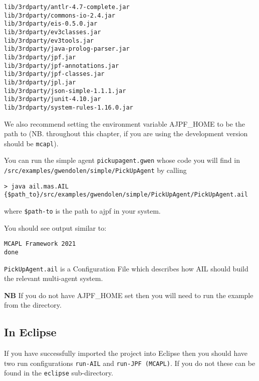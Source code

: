 \begin{verbatim}
lib/3rdparty/antlr-4.7-complete.jar
lib/3rdparty/commons-io-2.4.jar
lib/3rdparty/eis-0.5.0.jar
lib/3rdparty/ev3classes.jar
lib/3rdparty/ev3tools.jar
lib/3rdparty/java-prolog-parser.jar
lib/3rdparty/jpf.jar
lib/3rdparty/jpf-annotations.jar
lib/3rdparty/jpf-classes.jar
lib/3rdparty/jpl.jar
lib/3rdparty/json-simple-1.1.1.jar
lib/3rdparty/junit-4.10.jar
lib/3rdparty/system-rules-1.16.0.jar
\end{verbatim}

We also recommend setting the environment variable AJPF\_HOME to be the path to \texttt{\ajpfversion} (NB. throughout this chapter, if you are using the development version \texttt{\ajpfversion} should be \texttt{mcapl}).

You can run the simple agent \texttt{pickupagent.gwen} whose code you will find in \texttt{/src/examples/gwendolen/simple/PickUpAgent} by calling

\noindent \begin{lstlisting}[basicstyle=\tiny]
> java ail.mas.AIL {$path_to}/src/examples/gwendolen/simple/PickUpAgent/PickUpAgent.ail
\end{lstlisting}
\medskip

\noindent where \texttt{\${path-to}} is the path to ajpf in your system.

You should see output similar to:

\noindent \begin{lstlisting}
MCAPL Framework 2021
done
\end{lstlisting}
\medskip
 
\texttt{PickUpAgent.ail} is a Configuration File which describes how AIL should build the relevant multi-agent system.

{\bf NB}  If you do not have AJPF\_HOME set then you will need to run the example from the \texttt{\ajpfversion} directory.

\subsection{In Eclipse}

If you have successfully imported the project into Eclipse then you should have two run configurations \texttt{run-AIL} and \texttt{run-JPF (MCAPL)}.  If you do not these can be found in the \texttt{eclipse} sub-directory.

